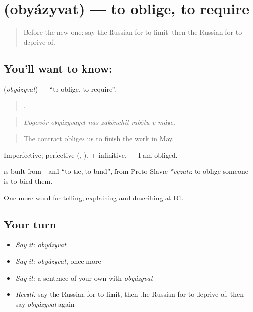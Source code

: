 \section[\texorpdfstring{\ru{обязывать} (obyázyvat)}{обязывать (obyázyvat)}]{ (obyázyvat) — to oblige, to require}

\label{lesson:RU-C392-obyazyvat}



\begin{quote}
Before the new one: say the Russian for to limit, then the Russian for to deprive of.
\end{quote}

\subsection*{You'll want to know: }
\textbf{} (\emph{obyázyvat}) — \textquotedblleft{}to oblige, to require\textquotedblright{}.

\begin{quote}
      .
\end{quote}

\begin{quote}
\emph{Dogovór obyázyvayet nas zakónchit rabótu v máye.}
\end{quote}

\begin{quote}
The contract obliges us to finish the work in May.
\end{quote}

Imperfective; perfective \emph{} (\emph{, }). \emph{ } + infinitive. \emph{ } — I am obliged.

\begin{cousinweb}
\textbf{} is built from \emph{-} and \emph{} \textquotedblleft{}to tie, to bind\textquotedblright{}, from Proto-Slavic \emph{*vęzati}: to oblige someone is to bind them.
\end{cousinweb}

\begin{grammarlens}[title={What you've built}]
One more word for telling, explaining and describing at B1.
\end{grammarlens}

\subsection*{Your turn}
\begin{itemize}
\raggedright
  \item \emph{Say it:} \emph{obyázyvat}
  \item \emph{Say it:} \emph{obyázyvat}, once more
  \item \emph{Say it:} a sentence of your own with \emph{obyázyvat}
  \item \emph{Recall:} say the Russian for to limit, then the Russian for to deprive of, then say \emph{obyázyvat} again
\end{itemize}

